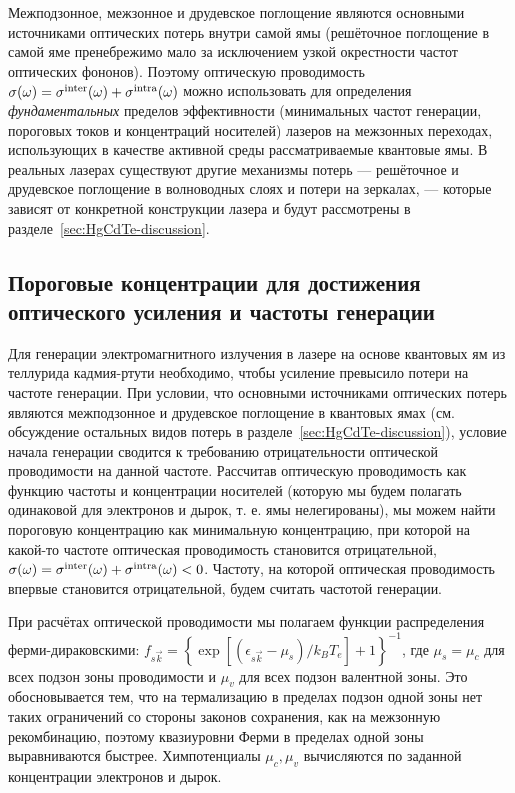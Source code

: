 Межподзонное, межзонное и друдевское поглощение являются основными источниками оптических потерь внутри самой ямы (решёточное поглощение в самой яме пренебрежимо мало за исключением узкой окрестности частот оптических фононов). Поэтому оптическую проводимость $\sigma(\omega) = \sigma^{\rm inter}(\omega) + \sigma^{\rm intra}(\omega)$ можно использовать для определения \emph{фундаментальных} пределов эффективности (минимальных частот генерации, пороговых токов и концентраций носителей) лазеров на межзонных переходах, использующих в качестве активной среды рассматриваемые квантовые ямы. В реальных лазерах существуют другие механизмы потерь --- решёточное и друдевское поглощение в волноводных слоях и потери на зеркалах, --- которые зависят от конкретной конструкции лазера и будут рассмотрены в разделе~\ref{sec:HgCdTe-discussion}.

\subsection{Пороговые концентрации для достижения оптического усиления и частоты генерации} \label{sec:HgCdTe-concentrations}
Для генерации электромагнитного излучения в лазере на основе квантовых ям из теллурида кадмия-ртути необходимо, чтобы усиление превысило потери на частоте генерации. При условии, что основными источниками оптических потерь являются межподзонное и друдевское поглощение в квантовых ямах (см. обсуждение остальных видов потерь в разделе~\ref{sec:HgCdTe-discussion}), условие начала генерации сводится к требованию отрицательности оптической проводимости на данной частоте. Рассчитав оптическую проводимость как функцию частоты и концентрации носителей (которую мы будем полагать одинаковой для электронов и дырок, т. е. ямы нелегированы), мы можем найти пороговую концентрацию как минимальную концентрацию, при которой на какой-то частоте оптическая проводимость становится отрицательной, $\sigma(\omega) = \sigma^{\rm inter}(\omega) + \sigma^{\rm intra}(\omega) < 0$. Частоту, на которой оптическая проводимость впервые становится отрицательной, будем считать частотой генерации.

При расчётах оптической проводимости мы полагаем функции распределения ферми-дираковскими: $f_{s \vec{k}} = \left\{ \exp\left[ (\epsilon_{s \vec{k}} - \mu_s)/k_B T_e \right] + 1 \right\}^{-1}$, где $\mu_s = \mu_c$ для всех подзон зоны проводимости и $\mu_v$ для всех подзон валентной зоны. Это обосновывается тем, что на термализацию в пределах подзон одной зоны нет таких ограничений со стороны законов сохранения, как на межзонную рекомбинацию, поэтому квазиуровни Ферми в пределах одной зоны выравниваются быстрее. Химпотенциалы $\mu_c, \mu_v$ вычисляются по заданной концентрации электронов и дырок.

